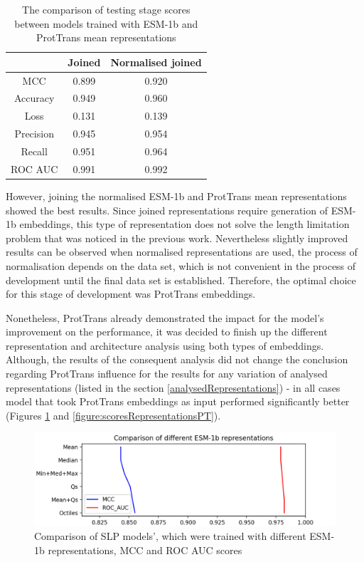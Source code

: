 \documentclass[12pt]{article}
\begin{document}
	\begin{table}[h!]
		\caption{The comparison of testing stage scores between 
		models trained with ESM-1b and ProtTrans mean 
		representations}
		\vspace{0.2cm}
		\centering
		\begin{tabular}{ | c | c c | }
			\hline 
						
			& Joined & Normalised joined \\
			\hline 
			MCC & 0.899 & 0.920 \\
			Accuracy & 0.949 & 0.960 \\
			Loss & 0.131 & 0.139 \\
			Precision & 0.945 & 0.954 \\
			Recall & 0.951 & 0.964 \\
			ROC AUC & 0.991 & 0.992 \\
			\hline    
		\end{tabular}
		\label{table:comparisonJoinedAndJoinedNorm}
	\end{table}

	However, joining the normalised ESM-1b and ProtTrans mean representations 
	showed the best results. Since joined representations require
	generation of ESM-1b embeddings, this type of representation does not 
	solve the length limitation problem that was noticed in the previous work. 
	Nevertheless slightly improved results can be observed when normalised 
	representations are used, the process of normalisation depends on the data 
	set, which is not convenient in the process of development until the 
	final data set is established. Therefore, the optimal choice for 
	this stage of development was ProtTrans embeddings.

	Nonetheless, ProtTrans already demonstrated the impact for the 
	model's improvement on the performance, it was decided to finish up 
	the different representation and architecture analysis using both 
	types of embeddings. Although, the results of the consequent analysis 
	did not change the conclusion regarding ProtTrans influence for the 
	results for any variation of analysed representations (listed in the
	section \ref{analysedRepresentations}) - in all cases model that took 
	ProtTrans embeddings as input performed significantly better (Figures 
	\ref{figure:scoresRepresentationsESM} and 
	\ref{figure:scoresRepresentationsPT}).

	\newpage

	\begin{figure}[h!]
		\centering
		\includegraphics[scale=0.7]{SLP_ESM_003_diff_representations.png}

		\caption{Comparison of SLP models', which were trained with different
		ESM-1b representations, MCC and ROC AUC scores}
		\label{figure:scoresRepresentationsESM}
	\end{figure}
\end{document}
